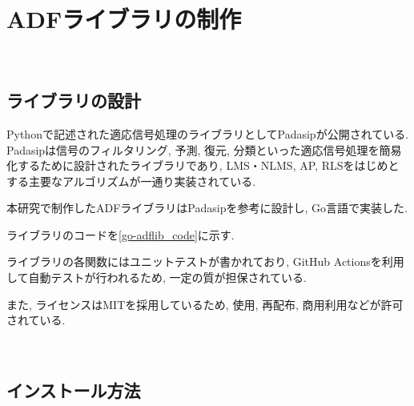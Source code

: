 





\section{ADFライブラリの制作}\label{create-adflib}

\
\subsection{ライブラリの設計}\label{design-adf}

Pythonで記述された適応信号処理のライブラリとしてPadasip\cite{padasip}が公開されている. Padasipは信号のフィルタリング, 予測, 復元, 分類といった適応信号処理を簡易化するために設計されたライブラリであり, LMS・NLMS, AP, RLSをはじめとする主要なアルゴリズムが一通り実装されている. 

本研究で制作したADFライブラリはPadasipを参考に設計し, Go言語で実装した. 

ライブラリのコードを\ref{go-adflib_code}に示す. 

ライブラリの各関数にはユニットテストが書かれており, GitHub
Actionsを利用して自動テストが行われるため, 一定の質が担保されている. 

また, ライセンスはMITを採用しているため, 使用, 再配布, 商用利用などが許可されている. %

\
\subsection{インストール方法}\label{how-to-install}

